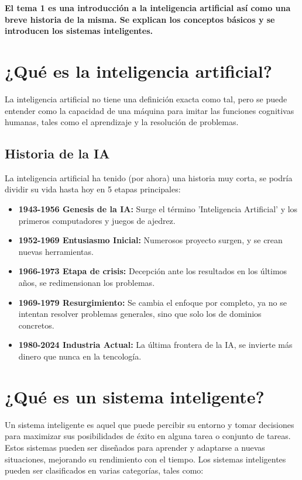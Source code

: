 \textbf{El tema 1 es una introducción a la inteligencia artificial así como una breve historia de la misma. 
Se explican los conceptos básicos y se introducen los sistemas inteligentes.}

\section{¿Qué es la inteligencia artificial?}
La inteligencia artificial no tiene una definición exacta como tal, pero se puede entender como la capacidad de una máquina para imitar las funciones cognitivas humanas, tales como el aprendizaje y la resolución de problemas.
\subsection{Historia de la IA}
La inteligencia artificial ha tenido (por ahora) una historia muy corta, se podría dividir su vida hasta hoy en 5 etapas principales:
\begin{itemize}
    \item \textbf{1943-1956 Genesis de la IA:} Surge el término 'Inteligencia Artificial' y los primeros computadores y juegos de ajedrez.
    \item \textbf{1952-1969 Entusiasmo Inicial:} Numerosos proyecto surgen, y se crean nuevas herramientas.
    \item \textbf{1966-1973 Etapa de crisis:} Decepción ante los resultados en los últimos años, se redimensionan los problemas.
    \item \textbf{1969-1979 Resurgimiento:} Se cambia el enfoque por completo, ya no se intentan resolver problemas generales, sino que solo los de dominios concretos.
    \item \textbf{1980-2024 Industria Actual:} La última frontera de la IA, se invierte más dinero que nunca en la tencología.
\end{itemize}

\section{¿Qué es un sistema inteligente?}

Un sistema inteligente es aquel que puede percibir su entorno y tomar decisiones para maximizar sus posibilidades de éxito en alguna tarea o conjunto de tareas. Estos sistemas pueden ser diseñados para aprender y adaptarse a nuevas situaciones, mejorando su rendimiento con el tiempo. Los sistemas inteligentes pueden ser clasificados en varias categorías, tales como:

